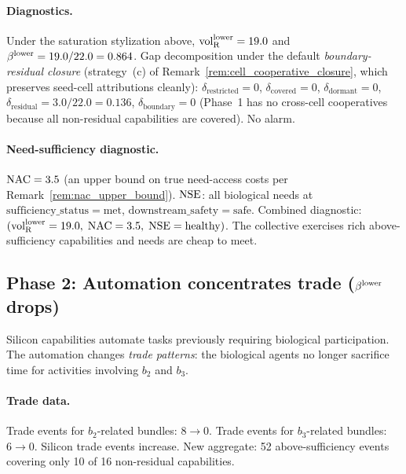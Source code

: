 \paragraph{Diagnostics.}
Under the saturation stylization above, ${\operatorname{vol}_{\mathrm{R}}^{\mathrm{lower}}} = 19.0$ and
$\beta^{\mathrm{lower}} = 19.0 / 22.0 = 0.864$.  Gap decomposition under the
default \emph{boundary-residual closure} (strategy~(c) of
Remark~\ref{rem:cell_cooperative_closure}, which preserves
seed-cell attributions cleanly):
$\delta_{\mathrm{restricted}} = 0$,
$\delta_{\mathrm{covered}} = 0$,
$\delta_{\mathrm{dormant}} = 0$,
$\delta_{\mathrm{residual}} = 3.0 / 22.0 = 0.136$,
$\delta_{\mathrm{boundary}} = 0$ (Phase~1 has no cross-cell
cooperatives because all non-residual capabilities are
covered).  No alarm.

\paragraph{Need-sufficiency diagnostic.}
$\mathrm{NAC} = 3.5$ (an upper bound on true need-access costs per
Remark~\ref{rem:nac_upper_bound}).  $\mathrm{NSE}$: all biological
needs at $\mathrm{sufficiency\_status} = \mathrm{met}$,
$\mathrm{downstream\_safety} = \mathrm{safe}$.  Combined
diagnostic: $({\operatorname{vol}_{\mathrm{R}}^{\mathrm{lower}}} = 19.0,\; \mathrm{NAC} = 3.5,\; \mathrm{NSE} =
\text{healthy})$.  The collective exercises rich above-sufficiency
capabilities and needs are cheap to meet.

\subsection{Phase 2: Automation concentrates trade ($\beta^{\mathrm{lower}}$
drops)}

Silicon capabilities automate tasks previously requiring
biological participation.  The automation changes \emph{trade
patterns}: the biological agents no longer sacrifice time for
activities involving $b_2$ and $b_3$.

\paragraph{Trade data.}
Trade events for $b_2$-related bundles:
$8 \to 0$.  Trade events for $b_3$-related bundles: $6 \to 0$.
Silicon trade events increase.  New aggregate: 52
above-sufficiency events covering only 10 of 16 non-residual
capabilities.

